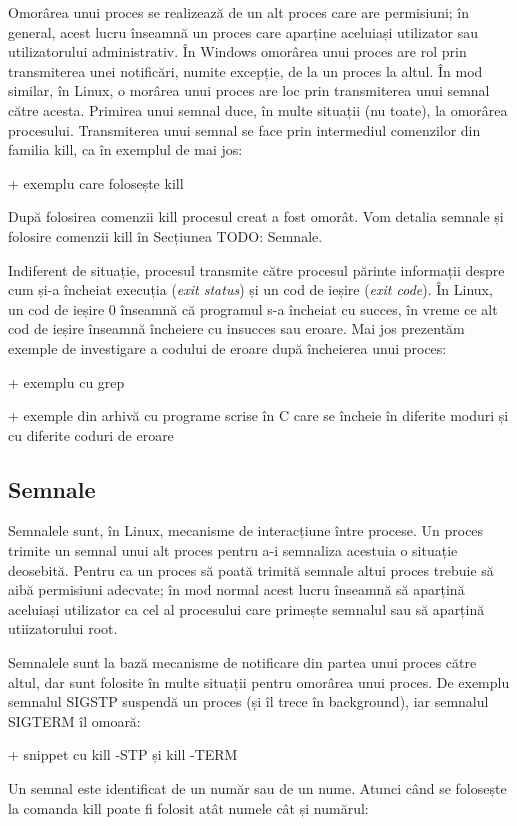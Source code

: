 Omorârea unui proces se realizează de un alt proces care are permisiuni; în
general, acest lucru înseamnă un proces care aparține aceluiași utilizator sau
utilizatorului administrativ. În Windows omorârea unui proces are rol prin
transmiterea unei notificări, numite excepție, de la un proces la altul. În mod
similar, în Linux, o morârea unui proces are loc prin transmiterea unui semnal
către acesta. Primirea unui semnal duce, în multe situații (nu toate), la
omorârea procesului. Transmiterea unui semnal se face prin intermediul
comenzilor din familia kill, ca în exemplul de mai jos:

+ exemplu care folosește kill

După folosirea comenzii kill procesul creat a fost omorât. Vom detalia semnale
și folosire comenzii kill în Secțiunea TODO: Semnale.

Indiferent de situație, procesul transmite către procesul părinte informații
despre cum și-a încheiat execuția (\textit{exit status}) și un cod de ieșire
(\textit{exit code}).  În Linux, un cod de ieșire 0 înseamnă că programul s-a
încheiat cu succes, în vreme ce alt cod de ieșire înseamnă încheiere cu insucces
sau eroare. Mai jos prezentăm exemple de investigare a codului de eroare după
încheierea unui proces:

+  exemplu cu grep

+  exemple din arhivă cu programe scrise în C care se încheie în diferite moduri
și cu diferite coduri de eroare

\subsection{Semnale}

Semnalele sunt, în Linux, mecanisme de interacțiune între procese. Un proces
trimite un semnal unui alt proces pentru a-i semnaliza acestuia o situație
deosebită. Pentru ca un proces să poată trimită semnale altui proces trebuie să
aibă permisiuni adecvate; în mod normal acest lucru înseamnă să aparțină
aceluiași utilizator ca cel al procesului care primește semnalul sau să aparțină
utiizatorului root.

Semnalele sunt la bază mecanisme de notificare din partea unui proces către
altul, dar sunt folosite în multe situații pentru omorârea unui proces. De
exemplu semnalul SIGSTP suspendă un proces (și îl trece în background), iar
semnalul SIGTERM îl omoară:

+  snippet cu kill -STP și kill -TERM

Un semnal este identificat de un număr sau de un nume. Atunci când se folosește
la comanda kill poate fi folosit atât numele cât și numărul:

